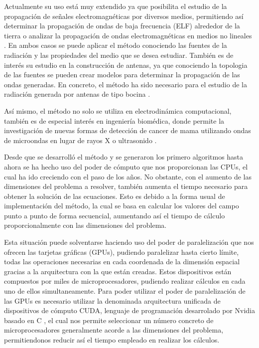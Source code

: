 \documentclass[11pt,a4paper,twoside,pdf]{article}
\numberwithin{equation}{section}
\begin{document}
Actualmente su uso está muy extendido ya que posibilita el estudio de la propagación de señales electromagnéticas por diversos medios, permitiendo así determinar la propagación de ondas de baja frecuencia (ELF) alrededor de la tierra \cite{Taflove2002} o analizar la propagación de ondas electromagnéticas en medios no lineales \cite{Goorjian1991}. En ambos casos se puede aplicar el método conociendo las fuentes de la radiación y las propiedades del medio que se desea estudiar. También es de interés su estudio en la construcción de antenas, ya que conociendo la topologia de las fuentes se pueden crear modelos para determinar la propagación de las ondas generadas. En concreto, el método ha sido necesario para el estudio de la radiación generada por antenas de tipo bocina \cite{Taflove1991}.

Así mismo, el método no solo se utiliza en electrodinámica computacional, también es de especial interés en ingeniería biomédica, donde permite la investigación de nuevas formas de detección de cancer de mama utilizando ondas de microondas en lugar de rayos X o ultrasonido \cite{Taflove1998}.

Desde que se desarrolló el método y se generaron los primero algoritmos hasta ahora se ha hecho uso del poder de cómputo que nos proporcionan las CPUs, el cual ha ido creciendo con el paso de los años. No obstante, con el aumento de las dimensiones del problema a resolver, también aumenta el tiempo necesario para obtener la solución de las ecuaciones. Esto es debido a la forma usual de implementación del método, la cual se basa en calcular los valores del campo punto a punto de forma secuencial, aumentando así el tiempo de cálculo proporcionalmente con las dimensiones del problema.

  Esta situación puede solventarse haciendo uso del poder de paralelización que nos ofrecen las tarjetas gráficas (GPUs), pudiendo paralelizar hasta cierto límite, todas las operaciones necesarias en cada coordenada de la dimensión espacial gracias a la arquitectura con la que están creadas. Estos dispositivos están compuestos por miles de microprocesadores, pudiendo realizar cálculos en cada uno de ellos simultaneamente. Para poder utilizar el poder de paralelización de las GPUs es necesario utilizar la denominada arquitectura unificada de dispositivos de cómputo CUDA, lenguaje de programación desarrolado por Nvidia basado en C \cite{web}, el cual nos permite seleccionar un número concreto de microprocesadores generalmente acorde a las dimensiones del problema, permitiendonos reducir así el tiempo empleado en realizar los cálculos.
\end{document}
